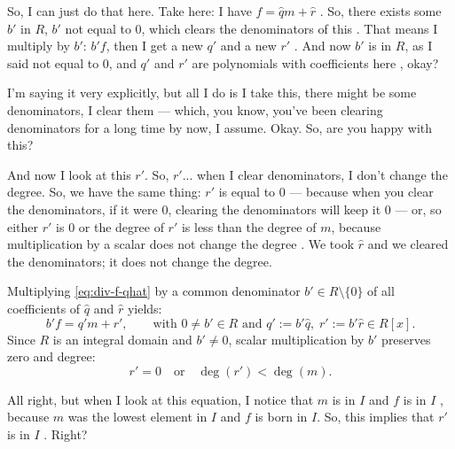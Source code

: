 \begin{proofWrapper}
\begin{speech}[00:25:01 - 00:26:40]
So, I can just do that here. Take here: I have $f = \hat{q} m + \hat{r}$ . So, there exists some $b'$ in $R$, $b'$ not equal to $0$, which clears the denominators of this . That means I multiply by $b'$: $b' f$, then I get a new $q'$ and a new $r'$ . And now $b'$ is in $R$, as I said not equal to $0$, and $q'$ and $r'$ are polynomials with coefficients here , okay?

I'm saying it very explicitly, but all I do is I take this, there might be some denominators, I clear them --- which, you know, you've been clearing denominators for a long time by now, I assume. Okay. So, are you happy with this?

And now I look at this $r'$. So, $r'$... when I clear denominators, I don't change the degree. So, we have the same thing: $r'$ is equal to $0$ --- because when you clear the denominators, if it were $0$, clearing the denominators will keep it $0$ --- or, so either $r'$ is $0$ or the degree of $r'$ is less than the degree of $m$, because multiplication by a scalar does not change the degree . We took $\hat{r}$ and we cleared the denominators; it does not change the degree.
\end{speech}

\begin{content}[{Clearing Denominators in $f = \hat{q} m + \hat{r}$}]
Multiplying \eqref{eq:div-f-qhat} by a common denominator $b' \in R \setminus \{0\}$ of all coefficients of $\hat{q}$ and $\hat{r}$ yields:
\begin{equation}\label{eq:cleared-f}
b' f = q' m + r', \qquad \text{with } 0 \neq b' \in R \text{ and } q' := b' \hat{q}, \; r' := b' \hat{r} \in R[x].
\end{equation}
Since $R$ is an integral domain and $b' \neq 0$, scalar multiplication by $b'$ preserves zero and degree:
\[
r' = 0 \quad \text{or} \quad \deg(r') < \deg(m).
\]
\end{content}

\begin{speech}[00:26:40 - 00:28:07]
All right, but when I look at this equation, I notice that $m$ is in $I$ and $f$ is in $I$ , because $m$ was the lowest element in $I$ and $f$ is born in $I$. So, this implies that $r'$ is in $I$ . Right?


\end{speech}
\end{proofWrapper}
